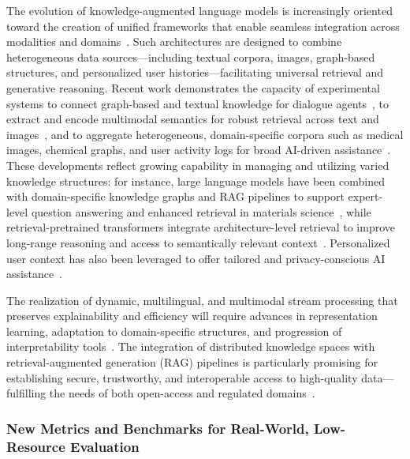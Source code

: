 \documentclass[sigconf]{acmart}
\begin{document}
The evolution of knowledge-augmented language models is increasingly oriented toward the creation of unified frameworks that enable seamless integration across modalities and domains~\cite{ref61,ref62,ref63,ref64}. Such architectures are designed to combine heterogeneous data sources—including textual corpora, images, graph-based structures, and personalized user histories—facilitating universal retrieval and generative reasoning. Recent work demonstrates the capacity of experimental systems to connect graph-based and textual knowledge for dialogue agents~\cite{ref29}, to extract and encode multimodal semantics for robust retrieval across text and images~\cite{ref43,ref62}, and to aggregate heterogeneous, domain-specific corpora such as medical images, chemical graphs, and user activity logs for broad AI-driven assistance~\cite{ref5,ref14,ref36,ref54}. These developments reflect growing capability in managing and utilizing varied knowledge structures: for instance, large language models have been combined with domain-specific knowledge graphs and RAG pipelines to support expert-level question answering and enhanced retrieval in materials science~\cite{ref29}, while retrieval-pretrained transformers integrate architecture-level retrieval to improve long-range reasoning and access to semantically relevant context~\cite{ref14}. Personalized user context has also been leveraged to offer tailored and privacy-conscious AI assistance~\cite{ref36}.

The realization of dynamic, multilingual, and multimodal stream processing that preserves explainability and efficiency will require advances in representation learning, adaptation to domain-specific structures, and progression of interpretability tools~\cite{ref43,ref54}. The integration of distributed knowledge spaces with retrieval-augmented generation (RAG) pipelines is particularly promising for establishing secure, trustworthy, and interoperable access to high-quality data—fulfilling the needs of both open-access and regulated domains~\cite{ref62,ref63,ref64}.

\subsubsection{New Metrics and Benchmarks for Real-World, Low-Resource Evaluation}
\end{document}
